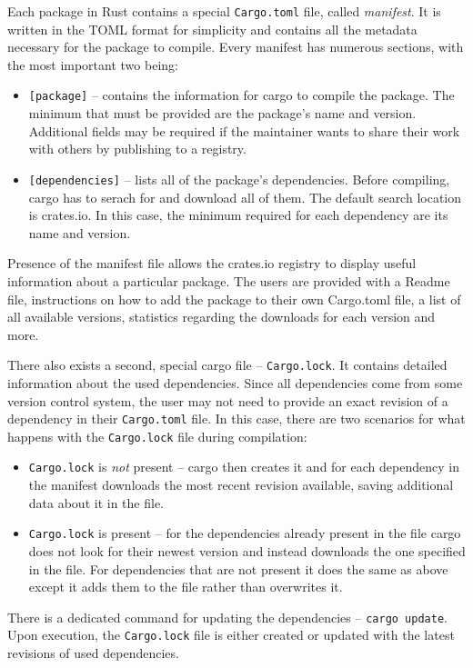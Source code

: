 \documentclass[licencjacka,en]{pracamgr}
\begin{document}
Each package in Rust contains a special \texttt{Cargo.toml} file, called \textit{manifest}. It is
written in the TOML format for simplicity and contains all the metadata necessary for the package
to compile. Every manifest has numerous sections, with the most important two being:
\begin{itemize}
	\item \texttt{[package]} -- contains the information for cargo to compile the package.
		The minimum that must be provided are the package's name and version. Additional fields may be
		required if the maintainer wants to share their work with others by publishing to a registry.
	\item \texttt{[dependencies]} -- lists all of the package's dependencies.
		Before compiling, cargo has to serach for and download all of them. The default search location
		is crates.io. In this case, the minimum required for each dependency are its name and version.
\end{itemize}
Presence of the manifest file allows the crates.io registry to display useful information about a particular package.
The users are provided with a Readme file, instructions on how to add the package to their own Cargo.toml
file, a list of all available versions, statistics regarding the downloads for each version and more.

There also exists a second, special cargo file -- \texttt{Cargo.lock}. It contains detailed information about
the used dependencies. Since all dependencies come from some version control system, the user may not need to
provide an exact revision of a dependency in their \texttt{Cargo.toml} file. In this case, there are two scenarios
for what happens with the \texttt{Cargo.lock} file during compilation:
\begin{itemize}
	\item \texttt{Cargo.lock} is \textit{not} present -- cargo then creates it and for each dependency in
		the manifest downloads the most recent revision available, saving additional data about
		it in the file.
	\item \texttt{Cargo.lock} is present -- for the dependencies already present in the file cargo does not
		look for their newest version and instead downloads the one specified in the file. For dependencies that
		are not present it does the same as above except it adds them to the file rather than overwrites it.
\end{itemize}
There is a dedicated command for updating the dependencies -- \texttt{cargo update}. Upon execution,
the \texttt{Cargo.lock} file is either created or updated with the latest revisions of used dependencies.
\end{document}
